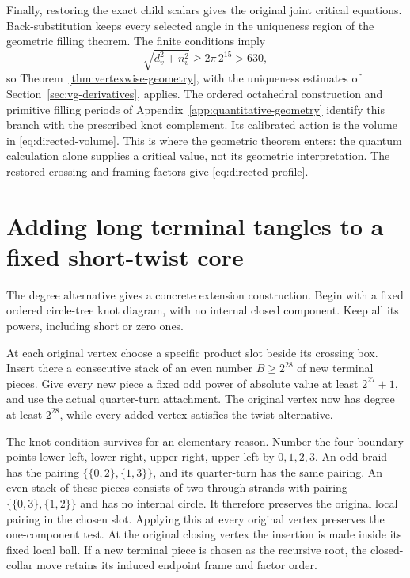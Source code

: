 Finally, restoring the exact child scalars gives the original joint
critical equations. Back-substitution keeps every selected angle in
the uniqueness region of the geometric filling theorem. The finite
conditions imply
\[
                    \sqrt{d_v^2+n_v^2}
                        \ge2\pi\,2^{15}>630,
\]
so Theorem~\ref{thm:vertexwise-geometry}, with the uniqueness estimates of Section~\ref{sec:vg-derivatives}, applies. The ordered octahedral construction and primitive filling periods
of Appendix~\ref{app:quantitative-geometry} identify this branch with
the prescribed knot complement. Its calibrated action is the volume in
\eqref{eq:directed-volume}. This is where the geometric theorem enters:
the quantum calculation alone supplies a critical value, not its
geometric interpretation. The restored crossing and framing factors
give \eqref{eq:directed-profile}.

\section{Adding long terminal tangles to a fixed short-twist core}

The degree alternative gives a concrete extension construction. Begin
with a fixed ordered circle-tree knot diagram, with no internal closed
component. Keep all its powers, including short or zero ones.

At each original vertex choose a specific product slot beside its
crossing box. Insert there a consecutive stack of an even number
$B\ge2^{28}$ of new terminal pieces. Give every new piece a fixed odd
power of absolute value at least $2^{27}+1$, and use the actual
quarter-turn attachment. The original vertex now has degree at least
$2^{28}$, while every added vertex satisfies the twist alternative.

The knot condition survives for an elementary reason. Number the
four boundary points lower left, lower right, upper right, upper left
by $0,1,2,3$. An odd braid has the pairing
$\{\{0,2\},\{1,3\}\}$, and its quarter-turn has the same pairing.
An even stack of these pieces consists of two through strands with
pairing $\{\{0,3\},\{1,2\}\}$ and has no internal circle. It therefore
preserves the original local pairing in the chosen slot. Applying this
at every original vertex preserves the one-component test.
At the original closing vertex the insertion is made inside its fixed
local ball. If a new terminal piece is chosen as the recursive root,
the closed-collar move retains its induced endpoint frame and factor order.

